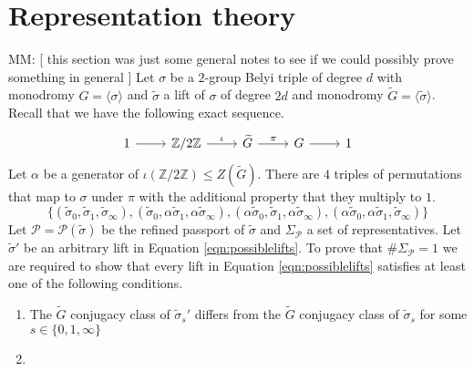 \documentclass{dcthesis}
\newcommand{\ZZ}{\mathbb Z}
\newcommand{\mm}[1]{{\color{blue} \sf MM: [#1]}}
\newcommand{\wt}[1]{\widetilde{#1}}
\numberwithin{equation}{section}
\theoremstyle{definition}
\theoremstyle{remark}
\begin{document}
{  \section{Representation theory}{\label{sec:reptheory}
    \mm{
      this section was just some general notes
      to see if we could possibly prove
      something in general
    }
    Let $\sigma$ be a $2$-group Belyi triple
    of degree $d$ with monodromy
    $G=\langle\sigma\rangle$
    and $\wt{\sigma}$ a lift of $\sigma$
    of degree $2d$ and monodromy
    $\wt{G}=\langle\wt{\sigma}\rangle$.
    Recall that we have the
    following exact sequence.
    \begin{equation}
      \label{eqn:reptheoryextension}
      \begin{tikzcd}
        1\arrow{r}&\ZZ/2\ZZ\arrow{r}{\iota}
                  &\wt{G}\arrow{r}{\pi}
                  &G\arrow{r}
                  &1
      \end{tikzcd}
    \end{equation}
    Let $\alpha$ be a generator of
    $\iota(\ZZ/2\ZZ)\leq Z(\wt{G})$.
    There are $4$ triples of permutations
    that map to $\sigma$ under $\pi$
    with the additional property that
    they multiply to $1$.
    \begin{equation}
      \label{eqn:possiblelifts}
      \{
        (\wt{\sigma}_0,\wt{\sigma}_1,\wt{\sigma}_\infty),
        (\wt{\sigma}_0,\alpha\wt{\sigma}_1,\alpha\wt{\sigma}_\infty),
        (\alpha\wt{\sigma}_0,\wt{\sigma}_1,\alpha\wt{\sigma}_\infty),
        (\alpha\wt{\sigma}_0,\alpha\wt{\sigma}_1,\wt{\sigma}_\infty)
      \}
    \end{equation}
    Let $\mathscr{P} = \mathscr{P}(\wt{\sigma})$
    be the refined passport of $\wt{\sigma}$
    and $\Sigma_\mathscr{P}$ a set of
    representatives.
    Let $\wt{\sigma}'$ be an arbitrary lift in
    Equation \ref{eqn:possiblelifts}.
    To prove that $\#\Sigma_\mathscr{P}=1$
    we are required to show that
    every lift in
    Equation \ref{eqn:possiblelifts}
    satisfies at least one of the following
    conditions.
    \begin{enumerate}
      \item\label{itm:distinctconjclassesreptheory}
        The $\wt{G}$
        conjugacy class of
        $\wt{\sigma}_s'$ differs from
        the $\wt{G}$
        conjugacy class of
        $\wt{\sigma}_s$ for
        some $s\in \{0,1,\infty\}$
      \item\label{itm:thereexistsanautoreptheory}

\end{enumerate}}}
\end{document}
